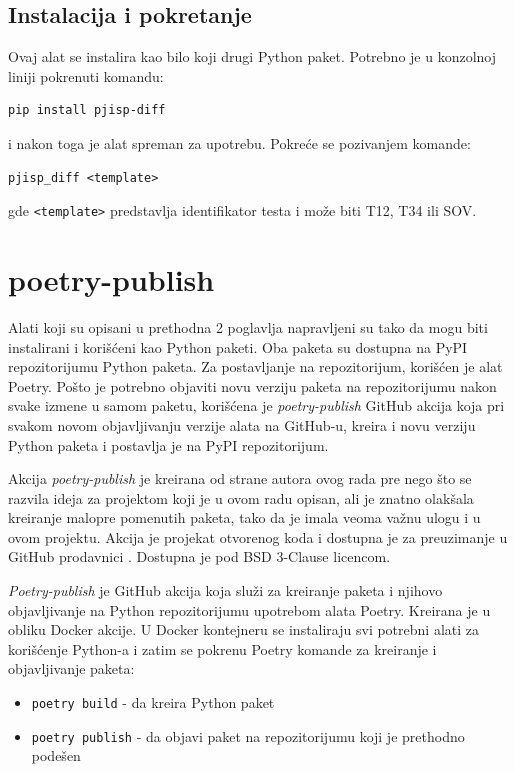 \documentclass[12pt]{report}
\begin{document}
\subsection{Instalacija i pokretanje}
Ovaj alat se instalira kao bilo koji drugi Python paket. Potrebno je u konzolnoj liniji pokrenuti komandu:

\begin{verbatim}
pip install pjisp-diff
\end{verbatim}

i nakon toga je alat spreman za upotrebu. Pokreće se pozivanjem komande:

\begin{verbatim}
pjisp_diff <template>
\end{verbatim}

gde \texttt{<template>} predstavlja identifikator testa i može biti T12, T34 ili SOV.

\section{poetry-publish}
Alati koji su opisani u prethodna 2 poglavlja napravljeni su tako da mogu biti instalirani i korišćeni kao Python paketi. Oba paketa su dostupna na PyPI repozitorijumu Python paketa. Za postavljanje na repozitorijum, korišćen je alat Poetry. Pošto je potrebno objaviti novu verziju paketa na repozitorijumu nakon svake izmene u samom paketu, korišćena je \textit{poetry-publish} \cite{poetry-publish-repo} GitHub akcija koja pri svakom novom objavljivanju verzije alata na GitHub-u, kreira i novu verziju Python paketa i postavlja je na PyPI repozitorijum.

Akcija \textit{poetry-publish} je kreirana od strane autora ovog rada pre nego što se razvila ideja za projektom koji je u ovom radu opisan, ali je znatno olakšala kreiranje malopre pomenutih paketa, tako da je imala veoma važnu ulogu i u ovom projektu. Akcija je projekat otvorenog koda i dostupna je za preuzimanje u GitHub prodavnici \cite{poetry-publish-marketplace}. Dostupna je pod BSD 3-Clause licencom.

\textit{Poetry-publish} je GitHub akcija koja služi za kreiranje paketa i njihovo objavljivanje na Python repozitorijumu upotrebom alata Poetry. Kreirana je u obliku Docker akcije. U Docker kontejneru se instaliraju svi potrebni alati za korišćenje Python-a i zatim se pokrenu Poetry komande za kreiranje i objavljivanje paketa:

\begin{itemize}
    \item \texttt{poetry build} - da kreira Python paket
    \item \texttt{poetry publish} - da objavi paket na repozitorijumu koji je prethodno podešen
\end{itemize}
\end{document}
